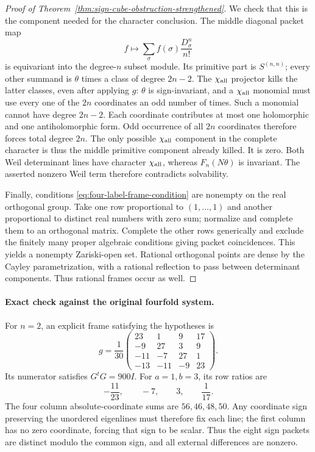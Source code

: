 \documentclass[11pt]{article}
\theoremstyle{definition}
\theoremstyle{remark}
\begin{document}
\begin{proof}[Proof of Theorem~\ref{thm:sign-cube-obstruction-strengthened}]
We check that this is the component needed for the character conclusion.
The middle diagonal packet map
\[
 f\longmapsto\sum_\sigma f(\sigma)\frac{D_\sigma^n}{n!}
\]
is equivariant into the degree-$n$ subset module.  Its primitive part is
$S^{(n,n)}$; every other summand is $\theta$ times a class of degree
$2n-2$.  The $\chi_{\rm all}$ projector kills the latter classes, even
after applying $g$: $\theta$ is sign-invariant, and a
$\chi_{\rm all}$ monomial must use every one of the $2n$ coordinates
an odd number of times.  Such a monomial cannot have degree $2n-2$.
Each coordinate contributes at most one holomorphic and one antiholomorphic form.  Odd occurrence of all $2n$ coordinates therefore forces total degree $2n$.  The only possible $\chi_{\rm all}$ component in the complete character is thus the middle primitive component already killed.  It is zero.
Both Weil determinant lines have character $\chi_{\rm all}$, whereas
$F_n(N\theta)$ is invariant.  The asserted nonzero Weil term therefore
contradicts solvability.

Finally, conditions \eqref{eq:four-label-frame-condition} are nonempty
on the real orthogonal group.  Take one row proportional to
$(1,\ldots,1)$ and another proportional to distinct real numbers with
zero sum; normalize and complete them to an orthogonal matrix.
Complete the other rows generically and exclude the finitely many proper
algebraic conditions giving packet coincidences.  This yields a nonempty
Zariski-open set.  Rational orthogonal points are dense by the Cayley
parametrization, with a rational reflection to pass between determinant
components.  Thus rational frames occur as well.
\end{proof}

\paragraph{Exact check against the original fourfold system.}
For $n=2$, an explicit frame satisfying the hypotheses is
\[
 g=\frac1{30}
 \begin{pmatrix}
 23&1&9&17\\
 -9&27&3&9\\
 -11&-7&27&1\\
 -13&-11&-9&23
 \end{pmatrix}.
\]
Its numerator satisfies $G^tG=900I$.  For $a=1,b=3$, its row ratios are
\[
 -\frac{11}{23},\qquad -7,\qquad 3,\qquad \frac1{17}.
\]
The four column absolute-coordinate sums are $56,46,48,50$.
Any coordinate sign preserving the unordered eigenlines must therefore
fix each line; the first column has no zero coordinate, forcing that
sign to be scalar.  Thus the eight sign packets are distinct modulo the
common sign, and all external differences are nonzero.
\end{document}
